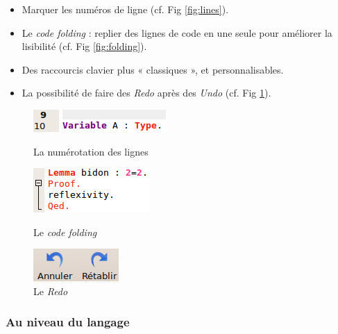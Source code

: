             \begin{itemize}
                \item Marquer les numéros de ligne (cf. Fig \ref{fig:lines}).
                \item Le \emph{code folding} : replier des lignes de code en une seule pour améliorer la lisibilité (cf. Fig \ref{fig:folding}).
                \item Des raccourcis clavier plus « classiques », et personnalisables.
                \item La possibilité de faire des \emph{Redo} après des \emph{Undo} (cf. Fig \ref{fig:redo}).
            \end{itemize}
            \begin{figure}[ht]
                \begin{minipage}[b]{0.3\linewidth}
                    \centering
                    \includegraphics[scale=0.5]{../images/ide/lines.png}
                    \caption{La numérotation des lignes}
                    \label{fig:lines}
                \end{minipage}
                \hfill
                \begin{minipage}[b]{0.3\linewidth}   
	                \centering
	                \includegraphics[scale=0.5]{../images/ide/folding.png}
	                \caption{Le \emph{code folding}}
	                \label{fig:folding}
                \end{minipage}
                \hfill
                \begin{minipage}[b]{0.3\linewidth}   
	                \centering
	                \includegraphics[scale=0.5]{../images/ide/redo.png}
	                \caption{Le \emph{Redo}}
	                \label{fig:redo}
	            \end{minipage}
            \end{figure}
            
        \subsubsection{Au niveau du langage}

